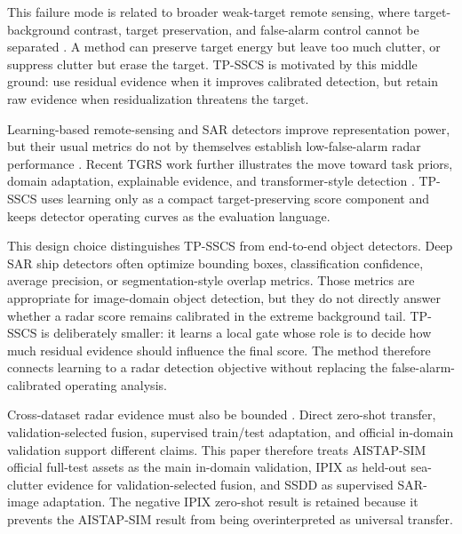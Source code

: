\documentclass[journal]{IEEEtran}
\begin{document}
This failure mode is related to broader weak-target remote sensing, where target-background contrast, target preservation, and false-alarm control cannot be separated \cite{panagopoulos2004smalltarget,liu2020polsarcfar,chen2022drenet,liu2025pgdn,wang2019ssdd,leng2023rawsar}. A method can preserve target energy but leave too much clutter, or suppress clutter but erase the target. TP-SSCS is motivated by this middle ground: use residual evidence when it improves calibrated detection, but retain raw evidence when residualization threatens the target.

Learning-based remote-sensing and SAR detectors improve representation power, but their usual metrics do not by themselves establish low-false-alarm radar performance \cite{zhu2017deeprs,zhu2021deeplearningsar,eldarymli2016saratr,zou2018ram,zhang2021ssdd,huang2018opensarship,wei2020hrsid,chen2022contrastive}. Recent TGRS work further illustrates the move toward task priors, domain adaptation, explainable evidence, and transformer-style detection \cite{liu2024evidence,zhou2024fewshot,shen2024ellknet,ma2024ssdnet,qin2025rdbdino}. TP-SSCS uses learning only as a compact target-preserving score component and keeps detector operating curves as the evaluation language.

This design choice distinguishes TP-SSCS from end-to-end object detectors. Deep SAR ship detectors often optimize bounding boxes, classification confidence, average precision, or segmentation-style overlap metrics. Those metrics are appropriate for image-domain object detection, but they do not directly answer whether a radar score remains calibrated in the extreme background tail. TP-SSCS is deliberately smaller: it learns a local gate whose role is to decide how much residual evidence should influence the final score. The method therefore connects learning to a radar detection objective without replacing the false-alarm-calibrated operating analysis.

Cross-dataset radar evidence must also be bounded \cite{tuia2016domain}. Direct zero-shot transfer, validation-selected fusion, supervised train/test adaptation, and official in-domain validation support different claims. This paper therefore treats AISTAP-SIM official full-test assets as the main in-domain validation, IPIX as held-out sea-clutter evidence for validation-selected fusion, and SSDD as supervised SAR-image adaptation. The negative IPIX zero-shot result is retained because it prevents the AISTAP-SIM result from being overinterpreted as universal transfer.
\end{document}
